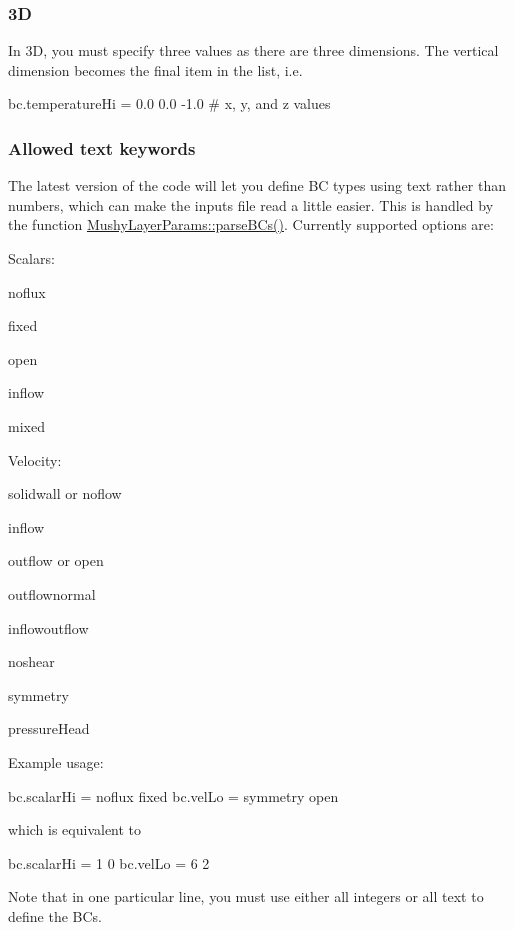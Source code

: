 \subsubsection*{3D}

In 3D, you must specify three values as there are three dimensions. The vertical dimension becomes the final item in the list, i.\+e.


\begin{DoxyCode}
bc.temperatureHi = 0.0 0.0 -1.0  # x, y, and z values
\end{DoxyCode}


\subsubsection*{Allowed text keywords}

The latest version of the code will let you define BC types using text rather than numbers, which can make the inputs file read a little easier. This is handled by the function {\ttfamily \hyperlink{class_mushy_layer_params_a497dc7bd7c29819bd697d255af8de3d6}{Mushy\+Layer\+Params\+::parse\+B\+Cs()}}. Currently supported options are\+:

Scalars\+:
\begin{DoxyItemize}
\item \textquotesingle{}noflux\textquotesingle{}
\item \textquotesingle{}fixed\textquotesingle{}
\item \textquotesingle{}open\textquotesingle{}
\item \textquotesingle{}inflow\textquotesingle{}
\item \textquotesingle{}mixed\textquotesingle{}
\end{DoxyItemize}

Velocity\+:
\begin{DoxyItemize}
\item \textquotesingle{}solidwall\textquotesingle{} or \textquotesingle{}noflow\textquotesingle{}
\item \textquotesingle{}inflow\textquotesingle{}
\item \textquotesingle{}outflow\textquotesingle{} or \textquotesingle{}open\textquotesingle{}
\item \textquotesingle{}outflownormal\textquotesingle{}
\item \textquotesingle{}inflowoutflow\textquotesingle{}
\item \textquotesingle{}noshear\textquotesingle{}
\item \textquotesingle{}symmetry\textquotesingle{}
\item \textquotesingle{}pressure\+Head\textquotesingle{}
\end{DoxyItemize}

Example usage\+:


\begin{DoxyCode}
bc.scalarHi = noflux fixed
bc.velLo = symmetry open
\end{DoxyCode}


which is equivalent to


\begin{DoxyCode}
bc.scalarHi = 1 0
bc.velLo = 6 2
\end{DoxyCode}


Note that in one particular line, you must use either all integers or all text to define the B\+Cs. 